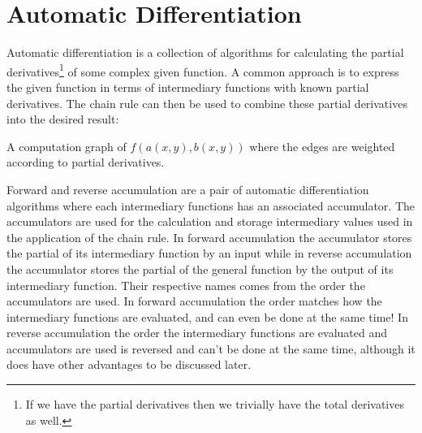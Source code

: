 
\chapter{Automatic Differentiation}
Automatic differentiation is a collection of algorithms for calculating the partial derivatives\footnote{If we have the partial derivatives then we trivially have the total derivatives as well.} of some complex given function.
A common approach is to express the given function in terms of intermediary functions with known partial derivatives.
The chain rule can then be used to combine these partial derivatives into the desired result:
\begin{center}

	A computation graph of $f(a(x,y),b(x,y))$ where the edges are weighted according to partial derivatives. 
\end{center}
Forward and reverse accumulation are a pair of automatic differentiation algorithms where each intermediary functions has an associated accumulator.
The accumulators are used for the calculation and storage intermediary values used in the application of the chain rule.
In forward accumulation the accumulator stores the partial of its intermediary function by an input while in reverse accumulation the accumulator stores the partial of the general function by the output of its intermediary function.
Their respective names comes from the order the accumulators are used.
In forward accumulation the order matches how the intermediary functions are evaluated,
and can even be done at the same time!
In reverse accumulation the order the intermediary functions are evaluated and accumulators are used is reversed and can't be done at the same time,
although it does have other advantages to be discussed later. 
